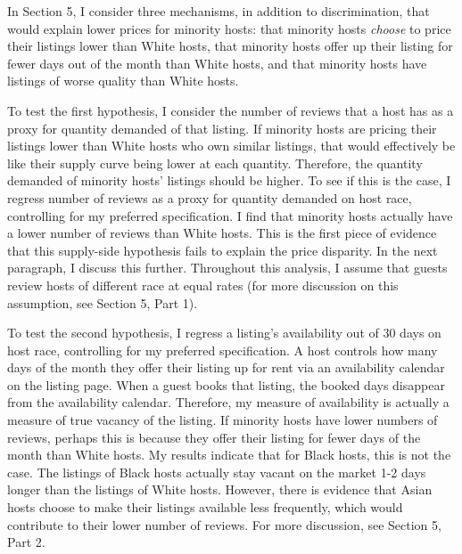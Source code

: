 \documentclass[11pt, oneside]{article}
\begin{document}
In Section 5, I consider three mechanisms, in addition to discrimination, that would explain lower prices for minority hosts: that minority hosts \textit{choose} to price their listings lower than White hosts, that minority hosts offer up their listing for fewer days out of the month than White hosts, and that minority hosts have listings of worse quality than White hosts. 

To test the first hypothesis, I consider the number of reviews that a host has as a proxy for quantity demanded of that listing. If minority hosts are pricing their listings lower than White hosts who own similar listings, that would effectively be like their supply curve being lower at each quantity. Therefore, the quantity demanded of minority hosts' listings should be higher. To see if this is the case, I regress number of reviews as a proxy for quantity demanded on host race, controlling for my preferred specification. I find that minority hosts actually have a lower number of reviews than White hosts. This is the first piece of evidence that this supply-side hypothesis fails to explain the price disparity. In the next paragraph, I discuss this further. Throughout this analysis, I assume that guests review hosts of different race at equal rates (for more discussion on this assumption, see Section 5, Part 1). 

To test the second hypothesis, I regress a listing's availability out of 30 days on host race, controlling for my preferred specification. A host controls how many days of the month they offer their listing up for rent via an availability calendar on the listing page. When a guest books that listing, the booked days disappear from the availability calendar. Therefore, my measure of availability is actually a measure of true vacancy of the listing. If minority hosts have lower numbers of reviews, perhaps this is because they offer their listing for fewer days of the month than White hosts. My results indicate that for Black hosts, this is not the case. The listings of Black hosts actually stay vacant on the market 1-2 days longer than the listings of White hosts. However, there is evidence that Asian hosts choose to make their listings available less frequently, which would contribute to their lower number of reviews. For more discussion, see Section 5, Part 2.      
\end{document}
